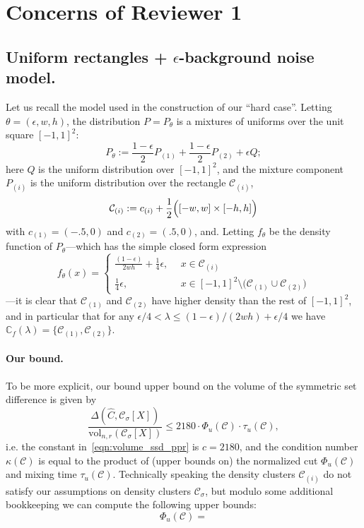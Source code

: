 \documentclass{article}
\newcommand{\vol}{\text{vol}}
\newcommand{\1}{\mathbf{1}}
\newcommand{\mc}[1]{\mathcal{#1}}
\newcommand{\wh}[1]{\widehat{#1}}
\theoremstyle{alden}
\theoremstyle{aldenthm}
\theoremstyle{definition}
\theoremstyle{remark}
\begin{document}
\section{Concerns of Reviewer 1}

\subsection{Uniform rectangles + $\epsilon$-background noise model.}
Let us recall the model used in the construction of our ``hard case''. Letting $\theta = (\epsilon,w,h)$, the distribution $P = P_{\theta}$ is a mixtures of uniforms over the unit square $[-1,1]^2$:
\begin{equation*}
P_{\theta} := \frac{1 - \epsilon}{2} P_{(1)} + \frac{1 - \epsilon}{2} P_{(2)} + \epsilon Q;
\end{equation*}
here $Q$ is the uniform distribution over $[-1,1]^2$, and the mixture component $P_{(i)}$ is the uniform distribution over the rectangle $\mc{C}_{(i)}$, 
\begin{equation*}
\mc{C}_{(i)} := c_{(i)} + \frac{1}{2}\Bigl([-w,w] \times [-h,h]\Bigr)
\end{equation*}
with $c_{(1)} = (-.5,0)$ and $c_{(2)} = (.5,0)$, and. Letting $f_{\theta}$ be the density function of $P_{\theta}$---which has the simple closed form expression
\begin{equation*}
f_{\theta}(x) =
\begin{cases}
\frac{(1 - \epsilon)}{2wh} + \frac{1}{4}\epsilon,& ~~ x \in \mc{C}_{(i)} \\
\frac{1}{4}\epsilon,& ~~ x \in [-1,1]^2 \setminus \bigl(\mc{C}_{(1)} \cup \mc{C}_{(2)}\bigr)
\end{cases}
\end{equation*}
---it is clear that $\mc{C}_{(1)}$ and $\mc{C}_{(2)}$ have higher density than the rest of $[-1,1]^2$, and in particular that for any $\epsilon/4 < \lambda \leq (1 - \epsilon)/(2wh) + \epsilon/4$ we have $\mathbb{C}_f(\lambda) = \{\mc{C}_{(1)}, \mc{C}_{(2)}\}$. 

\paragraph{Our bound.}
To be more explicit, our bound upper bound on the volume of the symmetric set difference is given by
\begin{equation}
\label{eqn:volume_ssd_ppr_explicit}
\frac{\Delta(\wh{C},\mc{C}_{\sigma}[X])}{\vol_{n,r}(\mc{C}_{\sigma}[X])} \leq 2180 \cdot \Phi_u(\mc{C}) \cdot \tau_{u}(\mc{C}),
\end{equation}
i.e. the constant in~\eqref{eqn:volume_ssd_ppr} is $c = 2180$, and the condition number $\kappa(\mc{C})$ is equal to the product of (upper bounds on) the normalized cut $\Phi_u(\mc{C})$ and mixing time $\tau_u(\mc{C})$. Technically speaking the density clusters $\mc{C}_{(i)}$ do not satisfy our assumptions on density clusters $\mc{C}_{\sigma}$, but modulo some additional bookkeeping we can compute the following upper bounds:
\begin{equation*}
\Phi_u(\mc{C}) = 
\end{equation*}
\end{document}
